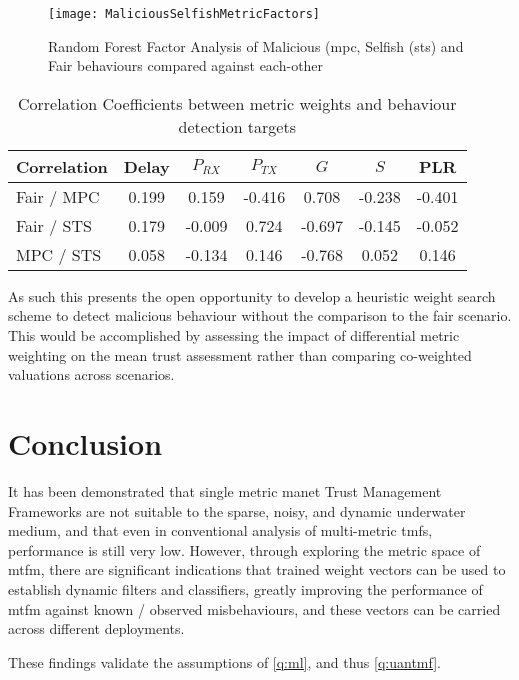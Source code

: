 \begin{figure}
	\centering
	\texttt{[image: MaliciousSelfishMetricFactors]}
	\caption{Random Forest Factor Analysis of Malicious (\gls{mpc}, Selfish (\gls{sts}) and Fair behaviours compared against each-other}
	\label{fig:malselfactors}
\end{figure}

\begin{table}[h]
	\caption{Correlation Coefficients between metric weights and behaviour detection targets} \label{tab:correlations}
	\begin{center}
		\begin{tabular}{lcccccc}
			\toprule
			Correlation      & Delay & $P_{RX}$ & $P_{TX}$ & $G$ & $S$ & PLR \\
			\midrule
			Fair / MPC       & 0.199 &  0.159   & -0.416  &  0.708   & -0.238   & -0.401\\
			Fair / STS       & 0.179 &  -0.009  &  0.724  & -0.697   & -0.145   & -0.052\\
			MPC / STS        & 0.058 &  -0.134  &  0.146  & -0.768   &  0.052   &  0.146\\
			\bottomrule
		\end{tabular}
	\end{center}
\end{table}

As such this presents the open opportunity to develop a heuristic weight search scheme to detect malicious behaviour without the comparison to the fair scenario.
This would be accomplished by assessing the impact of differential metric weighting on the mean trust assessment rather than comparing co-weighted valuations across scenarios.

\section{Conclusion}
It has been demonstrated that single metric \gls{manet} Trust Management Frameworks are not suitable to the sparse, noisy, and dynamic underwater medium, and that even in conventional analysis of multi-metric \glspl{tmf}, performance is still very low.
However, through exploring the metric space of \gls{mtfm}, there are significant indications that trained weight vectors can be used to establish dynamic filters and classifiers, greatly improving the performance of \gls{mtfm} against known / observed misbehaviours, and these vectors can be carried across different deployments. 

These findings validate the assumptions of \autoref{q:ml}, and thus \autoref{q:uantmf}.
 
